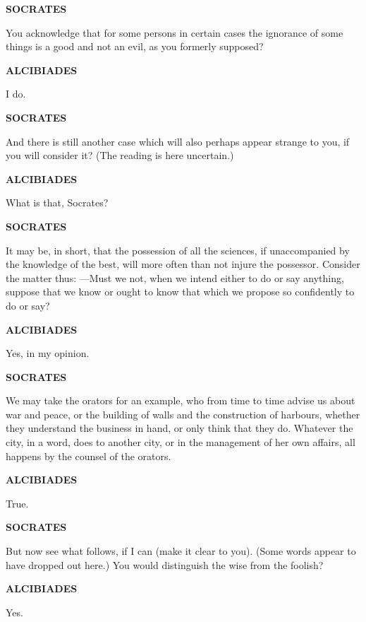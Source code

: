 \documentclass[11pt,letter]{article}
\begin{document}
\par \textbf{SOCRATES}
\par   You acknowledge that for some persons in certain cases the ignorance of some things is a good and not an evil, as you formerly supposed?

\par \textbf{ALCIBIADES}
\par   I do.

\par \textbf{SOCRATES}
\par   And there is still another case which will also perhaps appear strange to you, if you will consider it? (The reading is here uncertain.)

\par \textbf{ALCIBIADES}
\par   What is that, Socrates?

\par \textbf{SOCRATES}
\par   It may be, in short, that the possession of all the sciences, if unaccompanied by the knowledge of the best, will more often than not injure the possessor. Consider the matter thus: —Must we not, when we intend either to do or say anything, suppose that we know or ought to know that which we propose so confidently to do or say?

\par \textbf{ALCIBIADES}
\par   Yes, in my opinion.

\par \textbf{SOCRATES}
\par   We may take the orators for an example, who from time to time advise us about war and peace, or the building of walls and the construction of harbours, whether they understand the business in hand, or only think that they do. Whatever the city, in a word, does to another city, or in the management of her own affairs, all happens by the counsel of the orators.

\par \textbf{ALCIBIADES}
\par   True.

\par \textbf{SOCRATES}
\par   But now see what follows, if I can (make it clear to you). (Some words appear to have dropped out here.) You would distinguish the wise from the foolish?

\par \textbf{ALCIBIADES}
\par   Yes.
\end{document}
